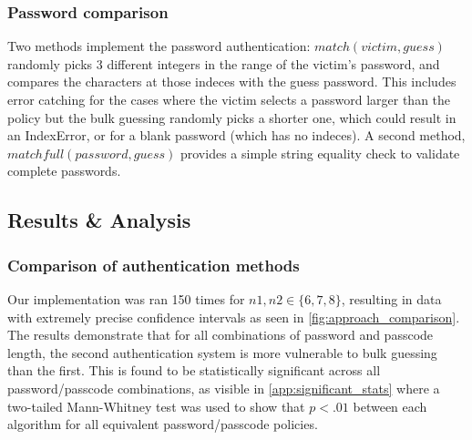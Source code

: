 \documentclass[british,10pt,a4paper]{article}
\begin{document}
\subsubsection{Password comparison}
Two methods implement the password authentication: $match(victim, guess)$ randomly picks 3 different integers in the range of the victim's password, and compares the characters at those indeces with the guess password. This includes error catching for the cases where the victim selects a password larger than the policy but the bulk guessing randomly picks a shorter one, which could result in an IndexError, or for a blank password (which has no indeces). A second method, $matchfull(password, guess)$ provides a simple string equality check to validate complete passwords.
 

\subsection{Results \& Analysis}
\subsubsection{Comparison of authentication methods}
Our implementation was ran 150 times for $n1, n2 \in \{6,7,8\}$, resulting in data with extremely precise confidence intervals as seen in \autoref{fig:approach_comparison}. The results demonstrate that for all combinations of password and passcode length, the second authentication system is more vulnerable to bulk guessing than the first. This is found to be statistically significant across all password/passcode combinations, as visible in \autoref{app:significant_stats} where a two-tailed Mann-Whitney test was used to show that $p<.01$ between each algorithm for all equivalent password/passcode policies. \newline 
\end{document}
